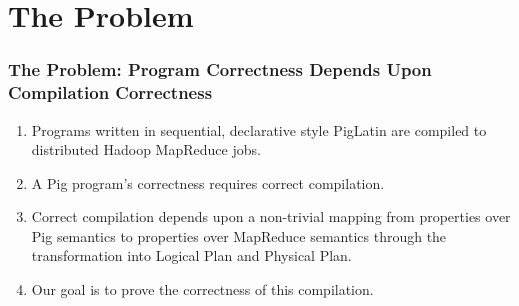\section{The Problem}

\begin{frame}
  \frametitle{The Problem: Program Correctness Depends Upon Compilation
    Correctness}
  \begin{enumerate}
    \item Programs written in sequential, declarative style PigLatin are
    compiled to distributed Hadoop MapReduce jobs.
    \item A Pig program's correctness requires correct compilation.
    \item Correct compilation depends upon a non-trivial mapping from
      properties over Pig semantics to properties over MapReduce semantics
      through the transformation into Logical Plan and Physical Plan.
    \item Our goal is to prove the correctness of this compilation.
  \end{enumerate}
\end{frame}
